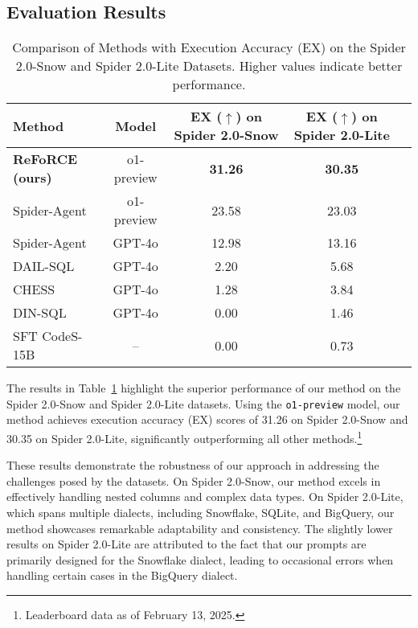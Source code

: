 \subsection{Evaluation Results}

\begin{table}[t]
\centering
\caption{Comparison of Methods with Execution Accuracy (EX) on the Spider 2.0-Snow and Spider 2.0-Lite Datasets. Higher values indicate better performance.}
\label{tab:method_comparison_combined}
\begin{tabular}{lcccc}
\toprule
\textbf{Method} & \textbf{Model} & \textbf{EX ($\uparrow$) on Spider 2.0-Snow} & \textbf{EX ($\uparrow$) on Spider 2.0-Lite} \\
\midrule
\textbf{ReFoRCE (ours)} & o1-preview & \textbf{31.26} & \textbf{30.35} \\
Spider-Agent & o1-preview & 23.58 & 23.03 \\
Spider-Agent & GPT-4o & 12.98 & 13.16 \\
DAIL-SQL & GPT-4o & 2.20 & 5.68 \\
CHESS & GPT-4o & 1.28 & 3.84 \\
DIN-SQL & GPT-4o & 0.00 & 1.46 \\
SFT CodeS-15B & -- & 0.00 & 0.73 \\
\bottomrule
\end{tabular}
\end{table}


The results in Table~\ref{tab:method_comparison_combined} highlight the superior performance of our method on the Spider 2.0-Snow and Spider 2.0-Lite datasets. Using the \texttt{o1-preview} model, our method achieves execution accuracy (EX) scores of 31.26 on Spider 2.0-Snow and 30.35 on Spider 2.0-Lite, significantly outperforming all other methods.\footnote{Leaderboard data as of February 13, 2025.}

These results demonstrate the robustness of our approach in addressing the challenges posed by the datasets. On Spider 2.0-Snow, our method excels in effectively handling nested columns and complex data types. On Spider 2.0-Lite, which spans multiple dialects, including Snowflake, SQLite, and BigQuery, our method showcases remarkable adaptability and consistency. The slightly lower results on Spider 2.0-Lite are attributed to the fact that our prompts are primarily designed for the Snowflake dialect, leading to occasional errors when handling certain cases in the BigQuery dialect.

